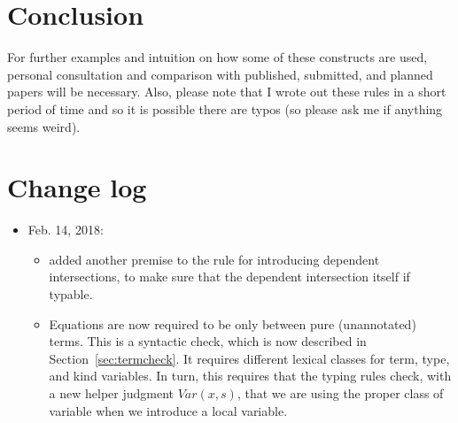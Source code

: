 \documentclass{article}
\begin{document}
\section{Conclusion}

For further examples and intuition on how some of these constructs are
used, personal consultation and comparison with published, submitted,
and planned papers will be necessary.  Also, please note that I wrote
out these rules in a short period of time and so it is possible there
are typos (so please ask me if anything seems weird).





\appendix 
\section{Change log}

\begin{itemize}
\item Feb. 14, 2018:
  \begin{itemize}
  \item added another premise to the rule for introducing dependent intersections, to
    make sure that the dependent intersection itself if typable.
  \item Equations are now required to be only between pure
    (unannotated) terms.  This is a syntactic check, which is now
    described in Section~\ref{sec:termcheck}.  It requires different
    lexical classes for term, type, and kind variables.  In turn, this
    requires that the typing rules check, with a new helper judgment
    $\textit{Var}(x,s)$, that we are using the proper class of
    variable when we introduce a local variable.

    
  \end{itemize}
\end{itemize}
\end{document}
